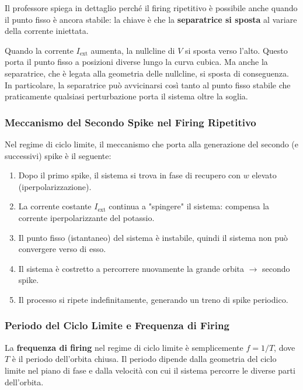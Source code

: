 Il professore spiega in dettaglio perché il firing ripetitivo è possibile anche quando il punto fisso è ancora stabile: la chiave è che la \textbf{separatrice si sposta} al variare della corrente iniettata.

Quando la corrente $I_{\text{ext}}$ aumenta, la nullcline di $V$ si sposta verso l'alto. Questo porta il punto fisso a posizioni diverse lungo la curva cubica. Ma anche la separatrice, che è legata alla geometria delle nullcline, si sposta di conseguenza. In particolare, la separatrice può avvicinarsi così tanto al punto fisso stabile che praticamente qualsiasi perturbazione porta il sistema oltre la soglia.

\subsubsection{Meccanismo del Secondo Spike nel Firing Ripetitivo}

Nel regime di ciclo limite, il meccanismo che porta alla generazione del secondo (e successivi) spike è il seguente:

\begin{enumerate}
    \item Dopo il primo spike, il sistema si trova in fase di recupero con $w$ elevato (iperpolarizzazione).
    \item La corrente costante $I_{\text{ext}}$ continua a "spingere" il sistema: compensa la corrente iperpolarizzante del potassio.
    \item Il punto fisso (istantaneo) del sistema è instabile, quindi il sistema non può convergere verso di esso.
    \item Il sistema è costretto a percorrere nuovamente la grande orbita $\rightarrow$ secondo spike.
    \item Il processo si ripete indefinitamente, generando un treno di spike periodico.
\end{enumerate}

\subsubsection{Periodo del Ciclo Limite e Frequenza di Firing}

La \textbf{frequenza di firing} nel regime di ciclo limite è semplicemente $f = 1/T$, dove $T$ è il periodo dell'orbita chiusa. Il periodo dipende dalla geometria del ciclo limite nel piano di fase e dalla velocità con cui il sistema percorre le diverse parti dell'orbita.

